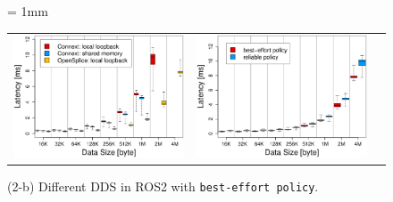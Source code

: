\documentclass{sig-alternate-05-2015}
\begin{document}
\begin{figure}[t]
  \tabcolsep = 1mm              %
  \begin{tabular}{ccc}
    \begin{minipage}[t]{0.322\textwidth}
      \includegraphics[width=1.0\linewidth]{../figure/comparison_DDS_BoxPlot.eps}
      \vspace{-7mm}
      \caption{(2-b) Different DDS in ROS2 with \texttt{best-effort policy}.}
      \label{fig:dds_boxplot}
    \end{minipage}
    &
    \begin{minipage}[t]{0.322\textwidth}
      \includegraphics[width=1.0\linewidth]{../figure/comparison_qos_BoxPlot.eps}
      \vspace{-7mm}

\end{minipage}
\end{tabular}
\end{figure}
\end{document}
